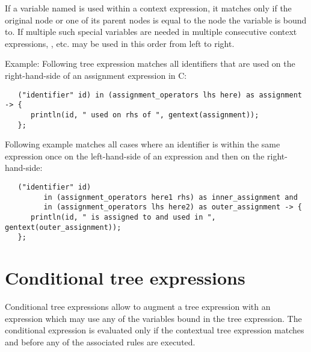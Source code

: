 \noindent
If a variable named  is used within a context expression,
it matches only if the original node or one of its parent nodes is equal
to the node the variable  is bound to. If multiple such
special variables are needed in multiple consecutive context expressions,
,  etc. may be used in this order from left
to right.

Example: Following tree expression matches all identifiers that are
used on the right-hand-side of an assignment expression in C:

\begin{lstlisting}
   ("identifier" id) in (assignment_operators lhs here) as assignment -> {
      println(id, " used on rhs of ", gentext(assignment));
   };
\end{lstlisting}

\noindent
Following example matches all cases where an identifier is within
the same expression once on the left-hand-side of an expression and
then on the right-hand-side:

\begin{lstlisting}
   ("identifier" id)
         in (assignment_operators here1 rhs) as inner_assignment and
         in (assignment_operators lhs here2) as outer_assignment -> {
      println(id, " is assigned to and used in ", gentext(outer_assignment));
   };
\end{lstlisting}

\section{Conditional tree expressions}

Conditional tree expressions allow to augment a tree expression with
an expression which may use any of the variables bound in the tree
expression. The conditional expression is evaluated only if the
contextual tree expression matches and before any of the associated
rules are executed.

\begin{grammar}
      \produces {} \\
      \produces {}
	  
\end{grammar}

\endinput
